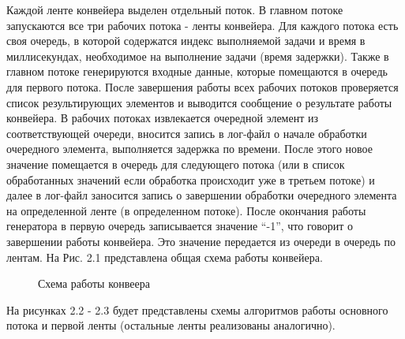 \documentclass[a4paper,12pt]{report}
\begin{document}
\hspace{0.6cm}Каждой ленте конвейера выделен отдельный поток. В главном потоке  запускаются все три рабочих потока - ленты конвейера. Для каждого потока есть своя очередь, в которой содержатся индекс выполняемой задачи и время в миллисекундах, необходимое на выполнение задачи (время задержки). Также в главном потоке генерируются входные данные, которые помещаются в очередь для первого потока. После завершения работы всех рабочих потоков проверяется список результирующих элементов и выводится сообщение о результате работы конвейера. В рабочих потоках извлекается очередной элемент из соответствующей очереди, вносится запись в лог-файл о начале обработки очередного элемента, выполняется задержка по времени. После этого новое значение помещается в очередь для следующего потока (или в список обработанных значений если обработка происходит уже в третьем потоке) и далее в лог-файл заносится запись о завершении обработки очередного элемента на определенной ленте (в определенном потоке). После окончания работы генератора в первую очередь записывается значение “-1”, что говорит о завершении работы конвейера. Это значение передается из очереди в очередь по лентам. На Рис. 2.1 представлена общая схема работы конвейера.

\begin{figure}[ht!]
\caption{Схема работы конвеера}
\end{figure}

\newpage

На рисунках 2.2 - 2.3 будет представлены схемы алгоритмов работы основного потока и первой ленты (остальные ленты реализованы аналогично).
\end{document}
